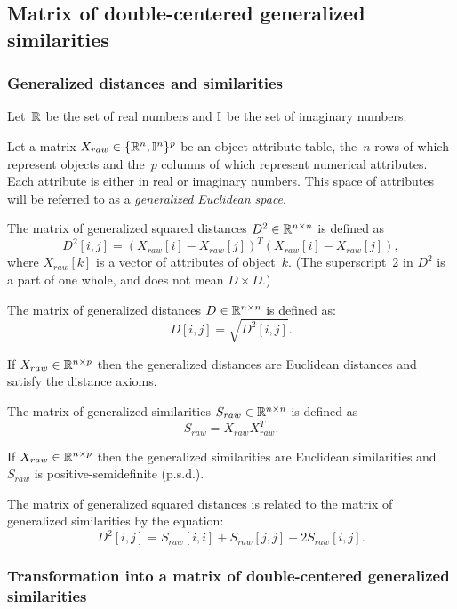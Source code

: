 \documentclass[10pt,a4paper]{article}
\begin{document}
\subsection {Matrix of double-centered generalized similarities}

\subsubsection {Generalized distances and similarities}

Let~$\mathbb R$ be the set of real numbers and $\mathbb I$ be the set of imaginary numbers.

Let a matrix $X_{raw} \in \{\mathbb R^n,\mathbb I^n\}^p$ be an object-attribute table, the~$n$ rows of which represent objects and the~$p$ columns of which represent numerical attributes. 
Each attribute is either in real or imaginary numbers. 
This space of attributes will be referred to as a {\em generalized Euclidean space}.

The matrix of generalized squared distances $D^2 \in \mathbb R^{n \times n}$ is defined as
$$ D^2[i,j] = (X_{raw}[i] - X_{raw}[j])^T (X_{raw}[i] - X_{raw}[j]),$$
where $X_{raw}[k]$ is a vector of attributes of object~$k$.
(The superscript~2 in $D^2$ is a part of one whole, and does not mean $D \times D$.)

The matrix of generalized distances $D \in \mathbb R^{n \times n}$ is defined as:
$$ D[i,j]  = \sqrt{D^2 [i,j]}. $$


If $X_{raw} \in \mathbb R^{n \times p}$ then the generalized distances are Euclidean distances and satisfy the distance axioms.

The matrix of generalized similarities $S_{raw} \in \mathbb R^{n \times n}$ is defined as
$$ S_{raw} = X_{raw} X_{raw}^T.$$

If $X_{raw} \in \mathbb R^{n \times p}$ then the generalized similarities are Euclidean similarities and $S_{raw}$ is positive-semidefinite (p.s.d.).


The matrix of generalized squared distances is related to the matrix of generalized similarities by the equation:
$$ D^2[i,j] = S_{raw}[i,i] + S_{raw}[j,j] - 2 S_{raw}[i,j].$$


\subsubsection {Transformation into a matrix of double-centered generalized similarities}
\end{document}
